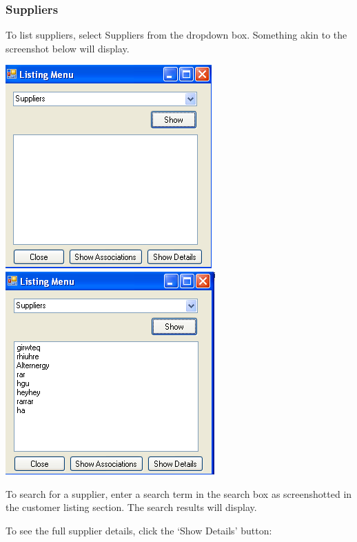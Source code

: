 		\subsubsection{Suppliers}
		
		To list suppliers, select Suppliers from the dropdown box.  Something akin to the screenshot below will display\footnotemark.
		
		\includegraphics[scale=0.5]{supplier-frmList-first_scrot}
		\includegraphics[scale=0.5]{supplier-frmList-second_scrot}
		
				
		To search for a supplier, enter a search term in the search box as screenshotted in the customer listing section.  The search results will display.
					
		To see the full supplier details, click the `Show Details' button:
		
